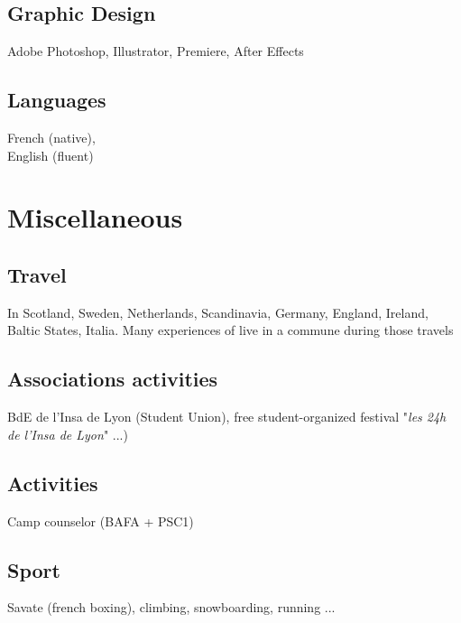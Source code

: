 	\subsection{Graphic Design}
		{Adobe Photoshop, Illustrator, Premiere, After Effects}

	\subsection{Languages}
		{French (native),\\English (fluent)}

\section{Miscellaneous}
	\subsection{Travel}
		{In Scotland, Sweden, Netherlands, Scandinavia, Germany, England, Ireland, Baltic States, Italia. Many experiences of live in a commune during those travels}

	\subsection{Associations activities}
		{BdE de l'Insa de Lyon (Student Union), free student-organized festival "\textit{les 24h de l'Insa de Lyon}" ...)}

	\subsection{Activities}
		{Camp counselor (BAFA + PSC1)}

	\subsection{Sport}
		{Savate (french boxing), climbing, snowboarding, running ...}

